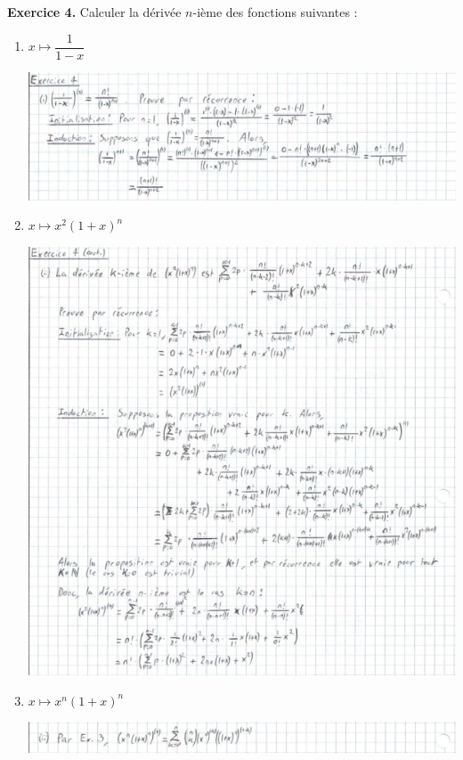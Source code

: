 \documentclass[a4paper, 10pt]{report}
\begin{document}
	\noindent
	\textbf{Exercice 4.} Calculer la dérivée $n$-ième des fonctions
	suivantes :
	\begin{enumerate}[label=(\roman*)]
		\item $x \mapsto \dfrac{1}{1 - x}$
		
		\includegraphics{ex04-p1.jpg}
		
		\item $x \mapsto x^2( 1 + x)^n$
		
		\includegraphics{ex04-p2.jpg}
		
		\item $x \mapsto x^n(1 + x)^n$
		
		\includegraphics{ex04-p3.jpg}
	\end{enumerate}
	
\end{document}
